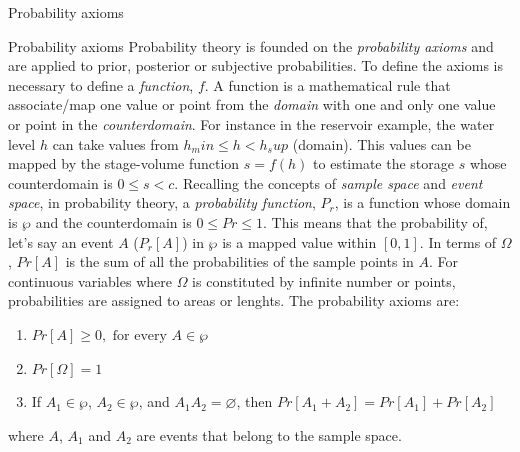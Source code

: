 \documentclass[8pt]{beamer}
\begin{document}
\begin{frame}{Probability axioms}
    \begin{block}{Probability axioms}
        Probability theory is founded on the \emph{probability axioms} and are applied to prior, posterior or subjective probabilities. To define the axioms is necessary to define a \emph{function}, $f$. A function is a mathematical rule that associate/map one value or point from the \emph{domain} with one and only one value or point in the \emph{counterdomain}.  For instance in the reservoir example, the water level $h$ can take values from $h_min \leq h < h_sup$ (domain). This values can be mapped by the stage-volume function $s = f(h)$ to estimate the storage $s$ whose counterdomain is $0 \leq s < c$. Recalling the concepts of \emph{sample space} and \emph{event space}, in probability theory, a \emph{probability function}, $P_r$, is a function whose domain is $\wp$ and the counterdomain is $0 \leq Pr \leq 1$. This means that the probability of, let's say an event $A$ ($P_r [A]$) in $\wp$ is a mapped value within $[0,1]$. In terms of $\Omega$, $Pr[A]$ is the sum of all the probabilities of the sample points in $A$. For continuous variables where $\Omega$ is constituted by infinite number or points, probabilities are assigned to areas or lenghts. The probability axioms are:
        \begin{enumerate}
            \item $Pr[A] \geq 0, \text{ for every } A \in \wp$
            \item $Pr[\Omega] = 1$
            \item If $A_1 \in \wp$, $A_2 \in \wp$, and $A_1 A_2 = \varnothing$, then $Pr [A_1 + A_2] = Pr[A_1] + Pr[A_2]$ 
        \end{enumerate}
        where $A$, $A_1$ and $A_2$ are events that belong to the sample space.  
    \end{block}
\end{frame}
\end{document}

